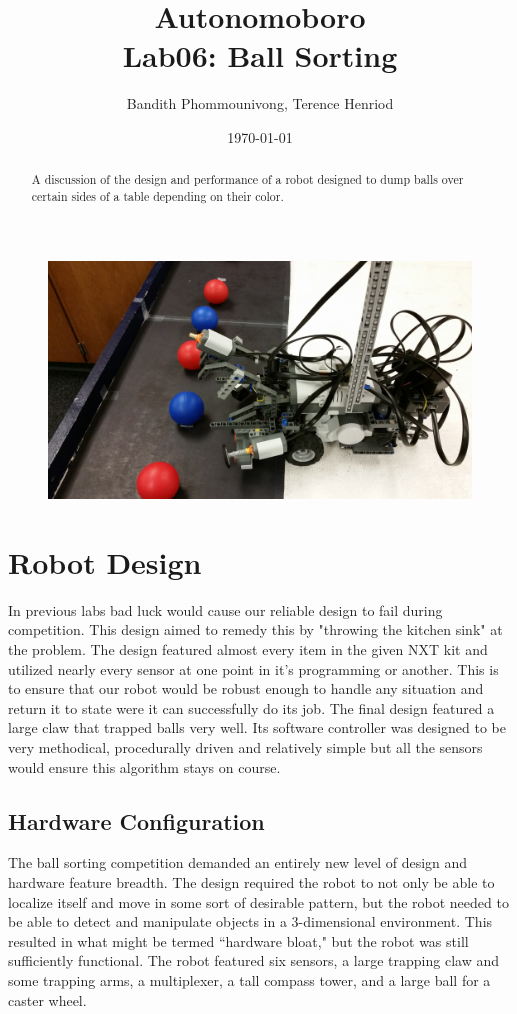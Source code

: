 \documentclass{article}
\title{Autonomoboro \\ Lab06: Ball Sorting}
\author{Bandith Phommounivong, Terence Henriod}
\date{\today}
\begin{document}
\maketitle

\begin{abstract}
A discussion of the design and performance of a robot designed to dump balls over certain sides of a table depending on their color.
\end{abstract}

  \begin{figure}[h!]
    \centering
    \includegraphics[width=.4\linewidth]{side_view}
    \label{fig:cover_pic}
  \end{figure}

\newpage
\section{Robot Design}
In previous labs bad luck would cause our reliable design to fail during competition. This design aimed to remedy this by "throwing the kitchen sink" at the problem. The design featured almost every item in the given NXT kit and utilized nearly every sensor at one point in it's programming or another. This is to ensure that our robot would be robust enough to handle any situation and return it to state were it can successfully do its job. The final design featured a large claw that trapped balls very well. Its software controller was designed to be very methodical, procedurally driven and relatively simple but all the sensors would ensure this algorithm stays on course. 

\subsection{Hardware Configuration}
The ball sorting competition demanded an entirely new level of design and hardware feature breadth. The design required the robot to not only be able to localize itself and move in some sort of desirable pattern, but the robot needed to be able to detect and manipulate objects in a 3-dimensional environment. This resulted in what might be termed ``hardware bloat," but the robot was still sufficiently functional. The robot featured six sensors, a large trapping claw and some trapping arms, a multiplexer, a tall compass tower, and a large ball for a caster wheel.
\end{document}
